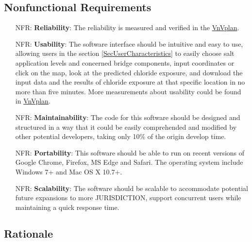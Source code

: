 \documentclass[12pt]{article}
\newcounter{nfrnum} %
\begin{document}
\subsection{Nonfunctional Requirements}

\noindent \begin{itemize}

\item[NFR\refstepcounter{nfrnum}\thenfrnum \label{NFR_Reliability}:]   \textbf{Reliability}: The reliability is measured and verified in the \href{https://github.com/CynthiaLiu0805/BridgeCorrosion/blob/main/docs/VnVPlan/VnVPlan.pdf}{VnVplan}.

\item[NFR\refstepcounter{nfrnum}\thenfrnum \label{NFR_Usability}:] \textbf{Usability}: The software interface should be intuitive and easy to use, allowing users in the section \ref{SecUserCharacteristics} to easily choose salt application levels and concerned bridge components, input coordinates or click on the map, look at the predicted chloride exposure, and download the input data and the results of chloride exposure at that specific location in no more than five minutes. More measurements about usability could be found in \href{https://github.com/CynthiaLiu0805/BridgeCorrosion/blob/main/docs/VnVPlan/VnVPlan.pdf}{VnVplan}.

\item[NFR\refstepcounter{nfrnum}\thenfrnum \label{NFR_Maintainability}:] \textbf{Maintainability}: The code for this software should be designed and structured in a way that it could be easily comprehended and modified by other potential developers, taking only 10\% of the origin develop time.

\item[NFR\refstepcounter{nfrnum}\thenfrnum \label{NFR_Portability}:]  \textbf{Portability}: This software should be able to run on recent versions of Google Chrome, Firefox, MS Edge and Safari. The operating system include Windows 7+ and Mac OS X 10.7+.

\item[NFR\refstepcounter{nfrnum}\thenfrnum \label{NFR_Scalability}:]   \textbf{Scalability}: The software should be scalable to accommodate potential future expansions to more JURISDICTION, support concurrent users while maintaining a quick response time.
\end{itemize}

\subsection{Rationale}
\end{document}

